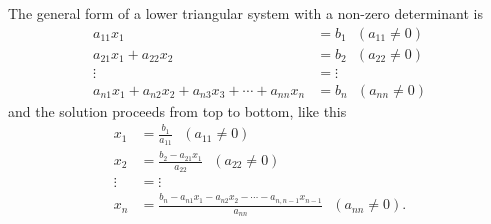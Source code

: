  The general form of a lower triangular system with a non-zero determinant is
\begin{equation}
    \begin{aligned}
         a_{11} x_1 &= b_1  ~~~(a_{11} \neq 0) \\
          a_{21} x_1 + a_{22} x_2 &=b_2 ~~~(a_{22} \neq 0)\\
     \vdots &= \vdots \\
          a_{n1} x_1 + a_{n2} x_2 + a_{n3} x_3+ \cdots +  a_{nn} x_n &=b_n ~~~(a_{nn} \neq 0)
    \end{aligned}
\end{equation}
and the solution proceeds from top to bottom, like this
\begin{equation}
    \begin{aligned}
         x_1 &= \frac{b_1}{a_{11}}  ~~~(a_{11} \neq 0) \\
           x_2 &= \frac{b_2- a_{21} x_1}{a_{22}} ~~~(a_{22} \neq 0)\\
     \vdots &= \vdots \\
          x_n &=\frac{b_n-a_{n1} x_1 - a_{n2} x_2 - \cdots  -a_{n,n-1} x_{n-1}}{a_{nn}}    ~~~(a_{nn} \neq 0).
    \end{aligned}
\end{equation}

